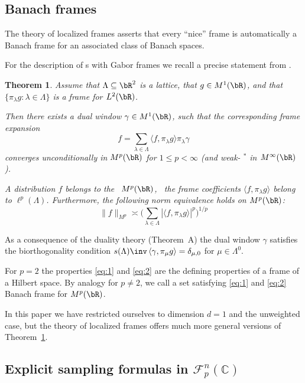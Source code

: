 \documentclass[12pt]{amsart}
\newtheorem{theorem}{Theorem}
\theoremstyle{plain}
\numberwithin{equation}{section}
\begin{document}
\subsection{Banach frames}

The theory of localized frames asserts that every ``nice'' frame is
automatically a Banach frame for an associated class of Banach spaces.

For the description of \modsp s with Gabor frames we recall a precise
statement from \cite[Thm.\ 9]{Localization_one}.

\begin{theorem}
\label{loc} Assume that $\Lambda \subseteq \bR ^2$ is a lattice, that $g\in
M^1(\bR )$, and that $\{\pi _\lambda g : \lambda \in \Lambda \}$ is a frame
for $L^2(\bR ) $.

Then there exists a dual window $\gamma \in M^1(\bR)$, such that the
corresponding frame expansion 
\begin{equation}  \label{eq:1}
f = \sum _{\lambda \in \Lambda } \langle f, \pi _\lambda g \rangle \pi
_\lambda \gamma
\end{equation}
converges unconditionally in $M^p (\bR )$ for $1 \leq p < \infty $ (and weak-%
$^*$ in $M^\infty (\bR )$ ).

A distribution $f$ belongs to the \modsp\ $M^p(\bR )$, \fif\ the frame
coefficients $\langle f, \pi _\lambda g\rangle $ belong to $\ell ^p(\Lambda
) $. Furthermore, the following norm equivalence holds on $M^p(\bR )$: 
\begin{equation}  \label{eq:2}
\|f\|_{M^p} \asymp \Big(\sum _{\lambda \in \Lambda } |\langle f, \pi
_\lambda g\rangle |^p \Big) ^{1/p}
\end{equation}
\end{theorem}

As a consequence of the duality theory (Theorem~A) the dual window $\gamma $
satisfies the biorthogonality condition $s(\Lambda )\inv \, \langle \gamma ,
\pi _\mu g \rangle = \delta _{\mu , 0}$ for $\mu \in \Lambda ^0$.

For $p=2$ the properties \eqref{eq:1} and \eqref{eq:2} are the defining
properties of a frame of a Hilbert space. By analogy for $p\neq 2$, we call
a set satisfying \eqref{eq:1} and \eqref{eq:2} Banach frame for $M^p(\bR )$.

In this paper we have restricted ourselves to dimension $d=1$ and the
unweighted case, but the theory of localized frames offers much more general
versions of Theorem~\ref{loc}.

\subsection{Explicit sampling formulas in $\mathcal{F}_{p}^{n}(%
\mathbb{C}
)$}
\end{document}
